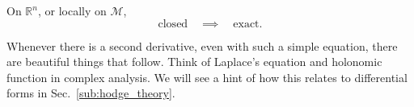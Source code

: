 \begin{claim}
  On $\mathbb{R}^n$, or locally on $\mathcal{M}$, 
  \begin{equation}
    \text{closed} \quad \implies \quad \text{exact}.
  \end{equation}
\end{claim}

\begin{leftbar}
  \begin{remark}
    Whenever there is a second derivative, even with such a simple equation, there are beautiful things that follow. Think of Laplace's equation and holonomic function in complex analysis. We will see a hint of how this relates to differential forms in Sec.~\ref{sub:hodge_theory}.
  \end{remark}
\end{leftbar}
